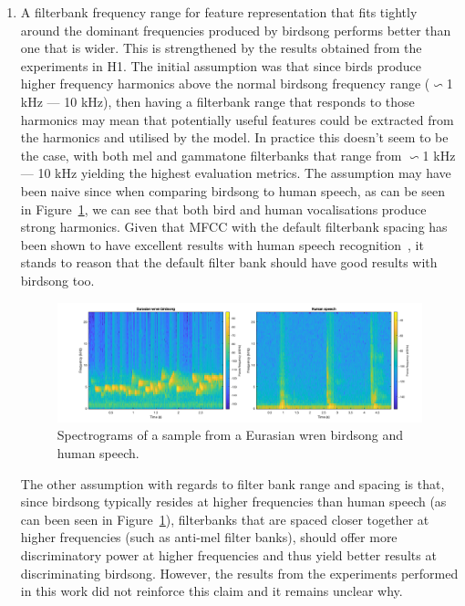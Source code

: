 \begin{enumerate}

  \item A filterbank frequency range for feature representation that fits
    tightly around the dominant frequencies produced by birdsong performs better
    than one that is wider. This is strengthened by the results obtained from
    the experiments in H1. The initial assumption was that since birds produce
    higher frequency harmonics above the normal birdsong frequency range
    ($\backsim$1 kHz --- 10 kHz), then having a filterbank range that responds
    to those harmonics may mean that potentially useful features could be
    extracted from the harmonics and utilised by the model. In practice this
    doesn't seem to be the case, with both mel and gammatone filterbanks that
    range from $\backsim$1 kHz --- 10 kHz yielding the highest evaluation
    metrics. The assumption may have been naive since when comparing birdsong to
    human speech, as can be seen in Figure~\ref{fig:wren_vs_human}, we can see
    that both bird and human vocalisations produce strong harmonics. Given that
    MFCC with the default filterbank spacing has been shown to have excellent
    results with human speech recognition~\cite{muda2010voice}, it stands to
    reason that the default filter bank should have good results with birdsong
    too.

    \begin{figure}[ht]
      \centering
      \includegraphics[width=\textwidth]{figures/wren_vs_human.png}
      \caption{Spectrograms of a sample from a Eurasian wren birdsong and human
      speech.}\label{fig:wren_vs_human}
    \end{figure}

    The other assumption with regards to filter bank range and spacing is that,
    since birdsong typically resides at higher frequencies than human speech (as
    can been seen in Figure~\ref{fig:wren_vs_human}), filterbanks that are
    spaced closer together at higher frequencies (such as anti-mel filter
    banks), should offer more discriminatory power at higher frequencies and
    thus yield better results at discriminating birdsong. However, the results
    from the experiments performed in this work did not reinforce this claim and
    it remains unclear why.


\end{enumerate}
